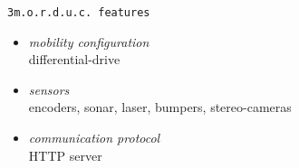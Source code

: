 {\begin{columns}
{\begin{block} {\alert{\texttt{3m.o.r.d.u.c. features}}}
\begin{itemize}
          \pause
        \item \alert{\textit{mobility configuration}} \\
          differential-drive
          \pause
          
        \item \alert{\textit{sensors}} \\
          encoders, sonar, laser, bumpers, stereo-cameras
          \pause
          
        \item \alert{\textit{communication protocol}} \\
          HTTP server
          
        \end{itemize}
        
      \end{block}
      
    }

  \end{columns}
  
}
